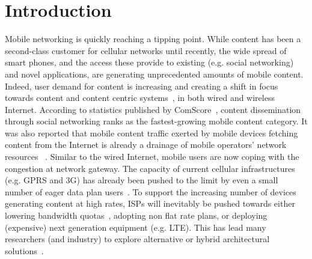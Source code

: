 \chapter{Introduction}
\label{chapter:Introduction}

Mobile networking is quickly reaching a tipping point. While content has been a second-class customer for cellular networks until recently, the wide spread of smart phones, and the access these provide to existing (e.g. social networking) and novel applications, are generating unprecedented amounts of mobile content. Indeed, user demand for content is increasing and creating a shift in focus towards content and content centric systems~\cite{CCN}, in both wired and wireless Internet. According to statistics published by ComScore~\cite{ComScore}, content dissemination through social networking ranks as the fastest-growing mobile content category. It was also reported that mobile content traffic exerted by mobile devices fetching content from the Internet is already a drainage of mobile operators' network resources~\cite{ATT,ATT2,Killer-DTN} . Similar to the wired Internet, mobile users are now coping with the congestion at network gateway. The capacity of current cellular infrastructures (e.g. GPRS and 3G) has already been pushed to the limit by even a small number of eager data plan users~\cite{ATT}. To support the increasing number of devices generating content at high rates, ISPs will inevitably be pushed towards either lowering bandwidth quotas~\cite{ATT}, adopting non flat rate plans, or deploying (expensive) next generation equipment (e.g. LTE). This has lead many researchers (and industry) to explore alternative or hybrid architectural solutions~\cite{CellOffLoading,Augmenting3G}. 

